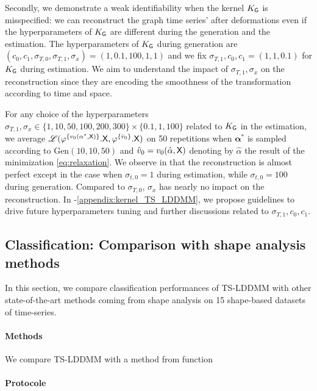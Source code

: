 Secondly, we demonstrate a weak identifiability when the kernel $K_{\mathsf{G}}$ is misspecified: we can reconstruct the graph time series' after deformations even if the hyperparameters of $K_{\mathsf{G}}$
are different during the generation and the estimation.
 The hyperparameters of $K_{\mathsf{G}}$ during generation are $(c_0,c_1,\sigma_{T,0},\sigma_{T,1},\sigma_x)=(1,0.1,100,1,1)$ and we fix $\sigma_{T,1},c_0,c_1=(1,1,0.1) $ for $K_{\mathsf{G}}$ during estimation.
 We aim to understand the impact of $\sigma_{T,1},\sigma_x$ on the reconstruction since they are encoding the smoothness of the transformation according to time and space.  

  For any choice of the hyperparameters $\sigma_{T,1},\sigma_x\in \{1,10,50,100,200,300 \}\times \{0.1,1,100\}$ related to $K_{\mathsf{G}}$ in the estimation,
   we average $\mathscr{L}(\varphi^{\{v_0(\mathbf{\alpha}^*,\mathsf{X})\}}.\mathsf{X},\varphi^{\{\hat{v}_0\}}.\mathsf{X})$ on 50 repetitions when $\mathbf{\alpha}^*$ is sampled according to Gen$(10,10,50)$ and $\hat{v}_0=v_0(\hat{\alpha},\mathsf{X})$ denoting by $\hat{\alpha}$ the result of the minimization \eqref{eq:relaxation}.
We observe in  that the reconstruction is almost perfect except in the case when $\sigma_{t,0}=1$ during estimation, while $ \sigma_{t,0}=100$ during generation.
 Compared to $\sigma_{T,0}$, $\sigma_x$ has nearly no impact on the reconstruction.
 In -\ref{appendix:kernel_TS_LDDMM}, we propose guidelines to drive future hyperparameters tuning and further discussions related to $\sigma_{T,1},c_0,c_1$. 


\subsection{Classification: Comparison with shape analysis methods}
\label{appendix:classification_shape_analysis}

In this section, we compare classification performances of TS-LDDMM with other state-of-the-art methods coming from shape analysis on 15 shape-based datasets of time-series.

\paragraph{Methods} We compare TS-LDDMM with a method from function~\cite{wu2024shape}

\paragraph{Protocole}

